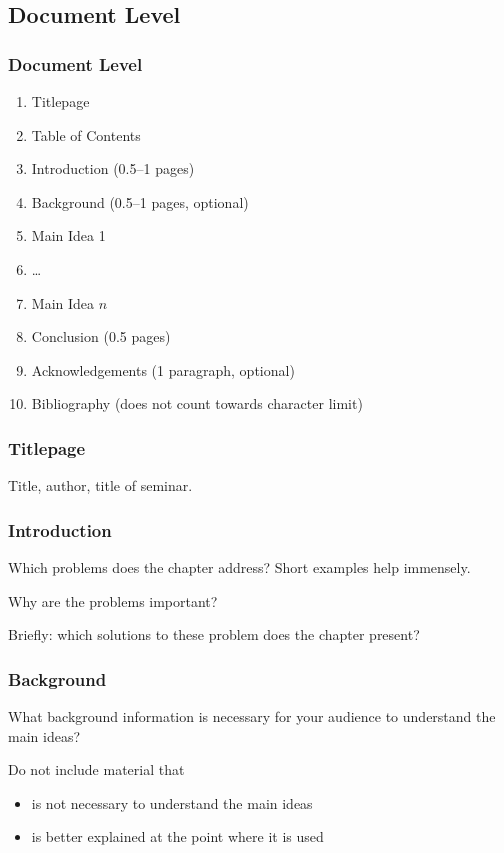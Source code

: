 \documentclass[xetex]{beamer}
\begin{document}
\subsection{Document Level}

\begin{frame}
  \frametitle{Document Level}

  \begin{enumerate}
    \item Titlepage
    \item Table of Contents
    \item Introduction (0.5--1 pages)
    \item Background (0.5--1 pages, optional)
    \item Main Idea 1
    \item \dots
    \item Main Idea $n$
    \item Conclusion (0.5 pages)
    \item Acknowledgements (1 paragraph, optional)
    \item Bibliography (does not count towards character limit)
  \end{enumerate}
\end{frame}

\begin{frame}
  \frametitle{Titlepage}

  Title, author, title of seminar.
\end{frame}

\begin{frame}
  \frametitle{Introduction}

  Which problems does the chapter address? Short examples help immensely.

  \medskip
  \pause

  Why are the problems important?

  \medskip
  \pause

  Briefly: which solutions to these problem does the chapter present?
\end{frame}

\begin{frame}
  \frametitle{Background}

  What background information is necessary for your audience to understand the main ideas?

  \medskip
  \pause

  Do not include material that
  \begin{itemize}
    \item is not necessary to understand the main ideas
    \item is better explained at the point where it is used
  \end{itemize}
\end{frame}
\end{document}
